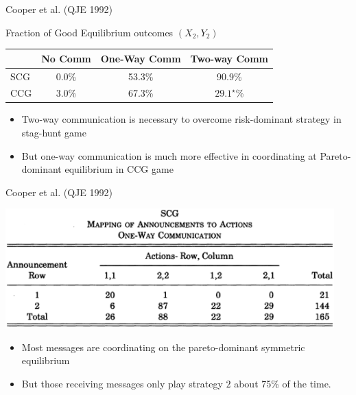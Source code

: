 \documentclass{beamer}
\begin{document}
\begin{frame}{Cooper et al. (QJE 1992)}
\begin{card}
	Fraction of Good Equilibrium  outcomes $(X_2,Y_2)$
			\begin{center}
			\begin{tabular}{lccc}
			\toprule & No Comm & One-Way Comm & Two-way Comm \\ \midrule
			SCG    &  0.0\%	 & 53.3\%       &  90.9\% \\
			CCG    &  3.0\%	 & 67.3\%       &  $29.1^\star$\%
			\\\bottomrule
			\end{tabular}\end{center}
\end{card}
    \begin{card}
    		\begin{itemize}
    			\item Two-way communication is necessary to overcome risk-dominant strategy in stag-hunt game
    			\item But one-way communication is much more effective in coordinating at Pareto-dominant equilibrium in CCG game
    		\end{itemize}
    \end{card}
\end{frame}

\begin{frame}{Cooper et al. (QJE 1992)}
\begin{card}
\begin{center}\includegraphics[width=0.95\textwidth]{./i/cdfr1992Tbl2.eps}\end{center}
\end{card}
\begin{card}
	\begin{itemize}
		\item Most messages are coordinating on the pareto-dominant symmetric equilibrium
		\item But those receiving messages only play strategy $2$  about 75\% of the time.
	\end{itemize}
\end{card}
\end{frame}
\end{document}
